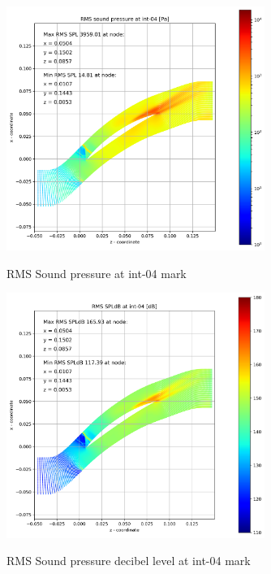 \begin{figure}[ht]
  \centering
  \includegraphics[width=0.75\textwidth]{Figures/int-04-rms-spl.png} \label{int-04-rms-spl}
  \caption{RMS Sound pressure at int-04 mark}
  
  \vspace*{\floatsep}%

  \includegraphics[width=0.75\textwidth]{Figures/int-04-rms-spldb.png} \label{int-04-rms-spldb}
  \caption{RMS Sound pressure decibel level at int-04 mark}
\end{figure}
